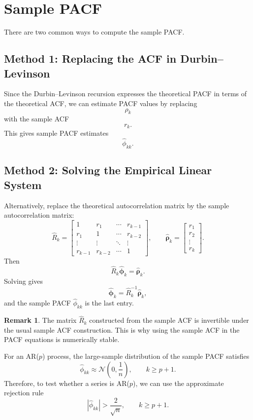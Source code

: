 \documentclass[12pt,oneside]{book}
\numberwithin{equation}{section}
\theoremstyle{definition}
\newtheorem{remark}{Remark}[section]
\theoremstyle{plain}
\theoremstyle{remark}
\newcommand{\Normal}{\mathcal{N}}
\begin{document}
\section{Sample PACF}

There are two common ways to compute the sample PACF.

\subsection{Method 1: Replacing the ACF in Durbin--Levinson}

Since the Durbin--Levinson recursion expresses the theoretical PACF in terms of the theoretical ACF, we can estimate PACF values by replacing
\[
\rho_k
\]
with the sample ACF
\[
r_k.
\]
This gives sample PACF estimates
\[
\widehat{\phi}_{kk}.
\]

\subsection{Method 2: Solving the Empirical Linear System}

Alternatively, replace the theoretical autocorrelation matrix by the sample autocorrelation matrix:
\[
\widehat{R}_k
=
\begin{bmatrix}
1 & r_1 & \cdots & r_{k-1}\\
r_1 & 1 & \cdots & r_{k-2}\\
\vdots & \vdots & \ddots & \vdots\\
r_{k-1} & r_{k-2} & \cdots & 1
\end{bmatrix},
\qquad
\widehat{\bm{\rho}}_k
=
\begin{bmatrix}
r_1\\
r_2\\
\vdots\\
r_k
\end{bmatrix}.
\]
Then
\[
\widehat{R}_k\widehat{\bm{\phi}}_k
=
\widehat{\bm{\rho}}_k.
\]
Solving gives
\[
\widehat{\bm{\phi}}_k
=
\widehat{R}_k^{-1}\widehat{\bm{\rho}}_k,
\]
and the sample PACF $\widehat{\phi}_{kk}$ is the last entry.

\begin{remark}
The matrix $\widehat{R}_k$ constructed from the sample ACF is invertible under the usual sample ACF construction. This is why using the sample ACF in the PACF equations is numerically stable.
\end{remark}

For an AR($p$) process, the large-sample distribution of the sample PACF satisfies
\[
\widehat{\phi}_{kk}
\approx
\Normal\left(0,\frac{1}{n}\right),
\qquad k\geq p+1.
\]
Therefore, to test whether a series is AR($p$), we can use the approximate rejection rule
\[
|\widehat{\phi}_{kk}|>\frac{2}{\sqrt{n}},
\qquad k\geq p+1.
\]
\end{document}
